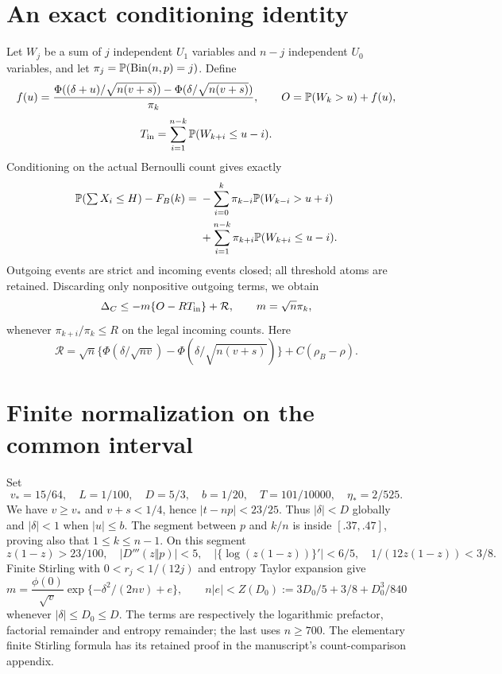 \documentclass[11pt]{article}
\begin{document}
\section{An exact conditioning identity}
Let $W_j$ be a sum of $j$ independent $U_1$ variables and $n-j$ independent
$U_0$ variables, and let $\pi_j=\mathbb P(\operatorname{Bin}(n,p)=j)$.
Define
\[
 f(u)=\frac{\Phi((\delta+u)/\sqrt{n(v+s)})-
                 \Phi(\delta/\sqrt{n(v+s)})}{\pi_k},\qquad
 O=\mathbb P(W_k>u)+f(u),
\]
\[
 T_{\rm in}=\sum_{i=1}^{n-k}\mathbb P(W_{k+i}\le u-i).
\]
Conditioning on the actual Bernoulli count gives exactly
\begin{align*}
\mathbb P(\textstyle\sum X_i\le H)-F_B(k)
={}&-\sum_{i=0}^{k}\pi_{k-i}\mathbb P(W_{k-i}>u+i)\\
 &+\sum_{i=1}^{n-k}\pi_{k+i}\mathbb P(W_{k+i}\le u-i).
\end{align*}
Outgoing events are strict and incoming events closed; all threshold atoms
are retained. Discarding only nonpositive outgoing terms, we obtain
\begin{equation}\label{eq:master}
 \Delta_C\le-m\{O-RT_{\rm in}\}+\mathcal R,
 \qquad m=\sqrt n\pi_k,
\end{equation}
whenever $\pi_{k+i}/\pi_k\le R$ on the legal incoming counts. Here
\[
\mathcal R=\sqrt n\{\Phi(\delta/\sqrt{nv})-
                \Phi(\delta/\sqrt{n(v+s)})\}+C(\rho_B-\rho).
\]

\section{Finite normalization on the common interval}
Set
\[
 v_*=15/64,\quad L=1/100,\quad D=5/3,\quad b=1/20,
 \quad T=101/10000,\quad \eta_*=2/525.
\]
We have $v\ge v_*$ and $v+s<1/4$, hence $|t-np|<23/25$.
Thus $|\delta|<D$ globally and $|\delta|<1$ when $|u|\le b$.
The segment between $p$ and $k/n$ is inside $[.37,.47]$, proving
also that $1\le k\le n-1$. On this segment
\[
 z(1-z)>23/100,\quad |D'''(z\Vert p)|<5,\quad
 |\{\log(z(1-z))\}'|<6/5,\quad 1/(12z(1-z))<3/8.
\]
Finite Stirling with $0<r_j<1/(12j)$ and entropy Taylor expansion give
\begin{equation}\label{eq:mass}
 m=\frac{\phi(0)}{\sqrt v}
       \exp\{-\delta^2/(2nv)+e\},\qquad
 n|e|<Z(D_0):=3D_0/5+3/8+D_0^3/840
\end{equation}
whenever $|\delta|\le D_0\le D$. The terms are respectively the
logarithmic prefactor, factorial remainder and entropy remainder; the last
uses $n\ge700$. The elementary finite Stirling formula has its retained
proof in the manuscript's count-comparison appendix.
\end{document}
